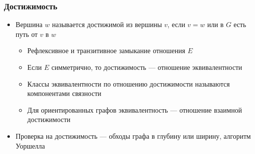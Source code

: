 \documentclass[xetex,mathserif,serif]{beamer}
\begin{document}
	\begin{frame}
		\frametitle{Достижимость}
		\begin{itemize}
			\item Вершина $w$ называется достижимой из вершины $v$, если $v = w$ или в $G$ есть путь от $v$ в $w$
			\begin{itemize}
				\item Рефлексивное и транзитивное замыкание отношения $E$
				\item Если $E$ симметрично, то достижимость --- отношение эквивалентности
				\item Классы эквивалентности по отношению достижимости называются компонентами связности
				\item Для ориентированных графов эквивалентность --- отношение взаимной достижимости
			\end{itemize}
			\item Проверка на достижимость --- обходы графа в глубину или ширину, алгоритм Уоршелла
		\end{itemize}
	\end{frame}
\end{document}
